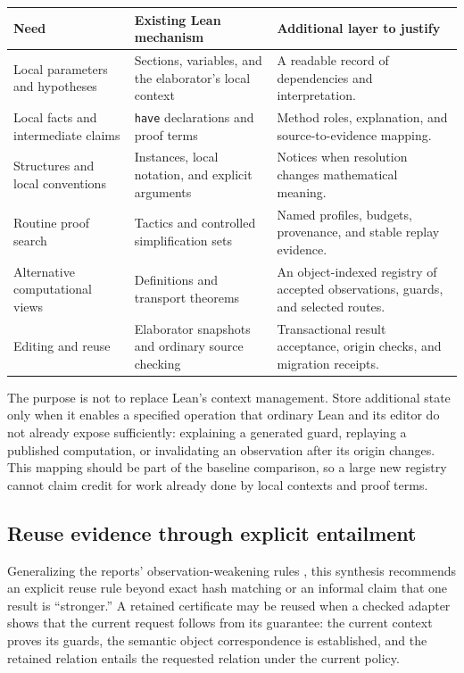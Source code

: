 \documentclass[11pt,letterpaper]{article}
\begin{document}
\begin{center}\small
\begin{tabularx}{\textwidth}{@{}P{1.4in}Y Y@{}}
\toprule
Need & Existing Lean mechanism & Additional layer to justify\\
\midrule
Local parameters and hypotheses & Sections, variables, and the elaborator's
local context & A readable record of dependencies and interpretation.\\
Local facts and intermediate claims & \texttt{have} declarations and proof terms
& Method roles, explanation, and source-to-evidence mapping.\\
Structures and local conventions & Instances, local notation, and explicit
arguments & Notices when resolution changes mathematical meaning.\\
Routine proof search & Tactics and controlled simplification sets & Named
profiles, budgets, provenance, and stable replay evidence.\\
Alternative computational views & Definitions and transport theorems & An
object-indexed registry of accepted observations, guards, and selected routes.\\
Editing and reuse & Elaborator snapshots and ordinary source checking &
Transactional result acceptance, origin checks, and migration receipts.\\
\bottomrule
\end{tabularx}
\end{center}

The purpose is not to replace Lean's context management. Store additional state
only when it enables a specified operation that ordinary Lean and its editor do
not already expose sufficiently: explaining a generated guard, replaying a
published computation, or invalidating an observation after its origin changes.
This mapping should be part of the baseline comparison, so a large new registry
cannot claim credit for work already done by local contexts and proof terms.

\subsection{Reuse evidence through explicit entailment}
Generalizing the reports' observation-weakening rules
\cite[\S7.4]{concord}\cite[\S4.3]{cadence}, this synthesis recommends an explicit
reuse rule beyond exact hash matching or an informal claim that one result is
``stronger.'' A retained
certificate may be reused when a checked adapter shows that the current request
follows from its guarantee: the current context proves its guards, the semantic
object correspondence is established, and the retained relation entails the
requested relation under the current policy.
\end{document}
